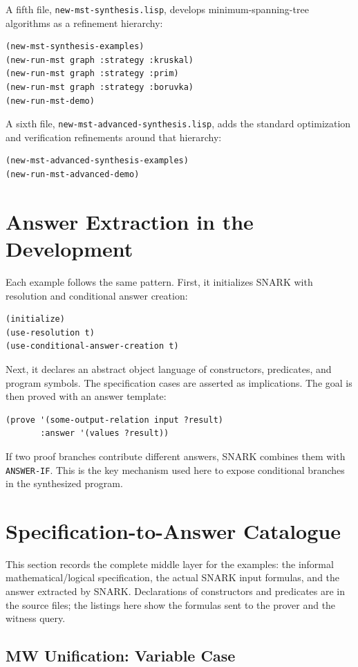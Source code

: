 \documentclass[runningheads]{llncs}
\begin{document}
A fifth file, \texttt{new-mst-synthesis.lisp}, develops minimum-spanning-tree
algorithms as a refinement hierarchy:
\begin{lstlisting}
(new-mst-synthesis-examples)
(new-run-mst graph :strategy :kruskal)
(new-run-mst graph :strategy :prim)
(new-run-mst graph :strategy :boruvka)
(new-run-mst-demo)
\end{lstlisting}

A sixth file, \texttt{new-mst-advanced-synthesis.lisp}, adds the standard
optimization and verification refinements around that hierarchy:
\begin{lstlisting}
(new-mst-advanced-synthesis-examples)
(new-run-mst-advanced-demo)
\end{lstlisting}

\section{Answer Extraction in the Development}

Each example follows the same pattern.  First, it initializes SNARK with
resolution and conditional answer creation:
\begin{lstlisting}
(initialize)
(use-resolution t)
(use-conditional-answer-creation t)
\end{lstlisting}
Next, it declares an abstract object language of constructors, predicates, and
program symbols.  The specification cases are asserted as implications.  The
goal is then proved with an answer template:
\begin{lstlisting}
(prove '(some-output-relation input ?result)
       :answer '(values ?result))
\end{lstlisting}
If two proof branches contribute different answers, SNARK combines them with
\texttt{ANSWER-IF}.  This is the key mechanism used here to expose conditional
branches in the synthesized program.

\section{Specification-to-Answer Catalogue}

This section records the complete middle layer for the examples: the informal
mathematical/logical specification, the actual SNARK input formulas, and the
answer extracted by SNARK.  Declarations of constructors and predicates are in
the source files; the listings here show the formulas sent to the prover and
the witness query.

\subsection{MW Unification: Variable Case}
\end{document}
